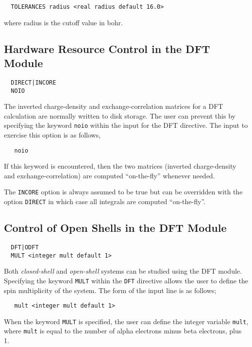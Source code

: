 \begin{verbatim}
  TOLERANCES radius <real radius default 16.0>
\end{verbatim}

where radius is the cutoff value in bohr.


\subsection{Hardware Resource Control in the DFT Module}
\begin{verbatim}
  DIRECT|INCORE
  NOIO
\end{verbatim}

The inverted charge-density and exchange-correlation matrices
for a DFT calculation are normally written to disk storage.  The user
can prevent this by specifying the keyword \verb+noio+ within the
input for the DFT directive.  The input to exercise this option is
as follows,

\begin{verbatim}
   noio
\end{verbatim}

If this keyword is encountered, then the two matrices (inverted
charge-density and exchange-correlation) are computed ``on-the-fly''
whenever needed.  

The \verb+INCORE+ option is always assumed to be true but can be
overridden with the option \verb+DIRECT+ in which case all integrals
are computed ``on-the-fly''.


\subsection{Control of Open Shells in the DFT Module}
\begin{verbatim}
  DFT|ODFT
  MULT <integer mult default 1>
\end{verbatim}

Both {\sl closed-shell} and {\sl open-shell} systems can be studied using
the DFT module.  Specifying the keyword \verb+MULT+ within the \verb+DFT+
directive allows the user to define the spin multiplicity of the system.
The form of the input line is as follows;

\begin{verbatim}
   mult <integer mult default 1> 
\end{verbatim}

When the keyword \verb+MULT+ is specified, the user can define the integer
variable \verb+mult+, where \verb+mult+ is equal to the number of alpha 
electrons minus beta electrons, plus 1.

